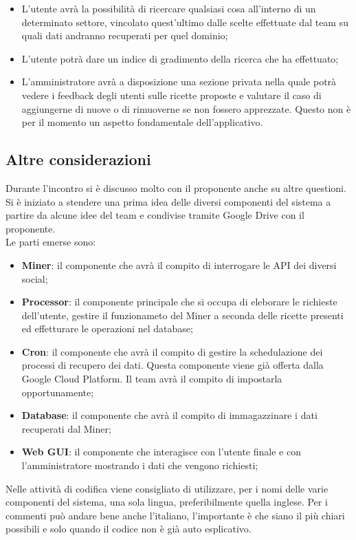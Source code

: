 \begin{itemize}
			\item L'utente avrà la possibilità di ricercare qualsiasi cosa all'interno di un determinato settore, vincolato quest'ultimo dalle scelte effettuate dal team su quali dati andranno recuperati per quel dominio;
			\item L'utente potrà dare un indice di gradimento della ricerca che ha effettuato;
			\item L'amministratore avrà a disposizione una sezione privata nella quale potrà vedere i feedback degli utenti sulle ricette proposte e valutare il caso di aggiungerne di nuove o di rimuoverne se non fossero apprezzate. Questo non è per il momento un aspetto fondamentale dell'applicativo.
		\end{itemize}

	\subsection{Altre considerazioni} %
	\label{sub:altre_considerazioni}
	Durante l'incontro si è discusso molto con il proponente anche su altre questioni. \\
	Si è iniziato a stendere una prima idea delle diversi componenti del sistema a partire da alcune idee del team e condivise tramite Google Drive con il proponente. \\
	Le parti emerse sono:
		\begin{itemize}
			\item \textbf{Miner}: il componente che avrà il compito di interrogare le API dei diversi social;
			\item \textbf{Processor}: il componente principale che si occupa di eleborare le richieste dell'utente, gestire il funzionameto del Miner a seconda delle ricette presenti ed effetturare le operazioni nel database;
			\item \textbf{Cron}: il componente che avrà il compito di gestire la schedulazione dei processi di recupero dei dati. Questa componente viene già offerta dalla Google Cloud Platform. Il team avrà il compito di impostarla opportunamente;
			\item \textbf{Database}: il componente che avrà il compito di immagazzinare i dati recuperati dal Miner;
			\item \textbf{Web GUI}: il componente che interagisce con l'utente finale e con l'amministratore mostrando i dati che vengono richiesti;
		\end{itemize}
	\noindent
	Nelle attività di codifica viene consigliato di utilizzare, per i nomi delle varie componenti del sistema, una sola lingua, preferibilmente quella inglese. Per i commenti può andare bene anche l'italiano, l'importante è che siano il più chiari possibili e solo quando il codice non è già auto esplicativo. \\

